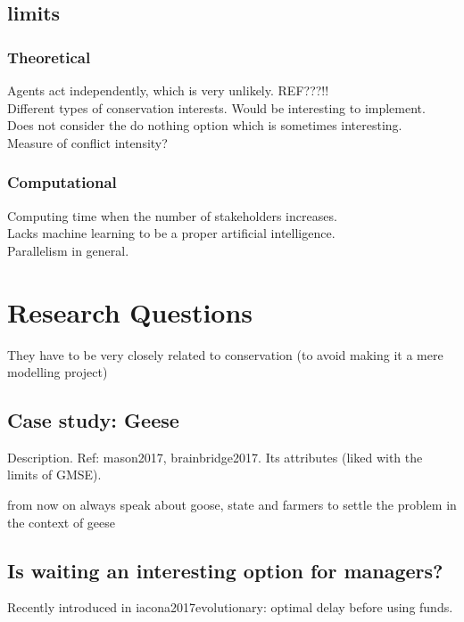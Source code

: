 \documentclass[12pt,a4paper]{article}
\begin{document}
\subsection{limits}

\subsubsection{Theoretical}

Agents act independently, which is very unlikely. REF???!!\\
Different types of conservation interests.
Would be interesting to implement.\\
Does not consider the do nothing option which is sometimes interesting.\\
Measure of conflict intensity?

\subsubsection{Computational}
Computing time when the number of stakeholders increases.\\
Lacks machine learning to be a proper artificial intelligence.\\
Parallelism in general.

\section{Research Questions}

They have to be very closely related to conservation (to avoid making it a mere modelling project)

\subsection{Case study: Geese}

Description. Ref: mason2017, brainbridge2017.
Its attributes (liked with the limits of GMSE). 

from now on always speak about goose, state and farmers to settle the problem in the context of geese

\subsection{Is waiting an interesting option for managers?}

Recently introduced in iacona2017evolutionary: optimal delay before using funds.
\end{document}
